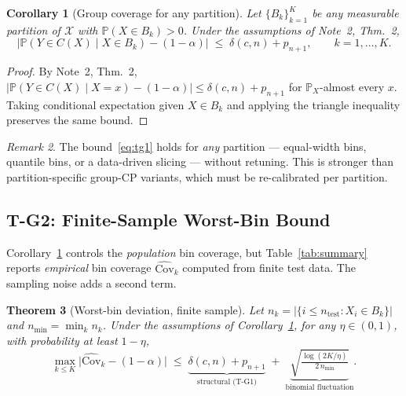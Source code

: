 \documentclass[11pt]{article}
\newtheorem{theorem}{Theorem}
\newtheorem{corollary}[theorem]{Corollary}
\theoremstyle{remark}
\newtheorem{remark}[theorem]{Remark}
\begin{document}
\begin{corollary}[Group coverage for any partition]
\label{cor:tg1}
Let $\{B_k\}_{k=1}^{K}$ be any measurable partition of $\mathcal X$
with $\mathbb P(X \in B_k) > 0$. Under the assumptions of Note~2,
Thm.~2,
\begin{equation}
\label{eq:tg1}
  \bigl|\mathbb P(Y \in C(X) \mid X \in B_k)-(1-\alpha)\bigr|
  \;\le\; \delta(c,n) + p_{n+1},
  \qquad k = 1,\ldots,K.
\end{equation}
\end{corollary}

\begin{proof}[Proof]
By Note~2, Thm.~2, $\bigl|\mathbb P(Y\in C(X)\mid X=x) - (1-\alpha)\bigr|
\le \delta(c,n) + p_{n+1}$ for $\mathbb P_X$-almost every $x$. Taking
conditional expectation given $X\in B_k$ and applying the triangle
inequality preserves the same bound.
\end{proof}

\begin{remark}
The bound~\eqref{eq:tg1} holds for \emph{any} partition --- equal-width
bins, quantile bins, or a data-driven slicing --- without retuning.
This is stronger than partition-specific group-CP variants, which must
be re-calibrated per partition.
\end{remark}

\subsection{T-G2: Finite-Sample Worst-Bin Bound}
\label{sec:tg2}

Corollary~\ref{cor:tg1} controls the \emph{population} bin coverage,
but Table~\ref{tab:summary} reports \emph{empirical} bin coverage
$\widehat{\mathrm{Cov}}_k$ computed from finite test data. The sampling
noise adds a second term.

\begin{theorem}[Worst-bin deviation, finite sample]
\label{thm:tg2}
Let $n_k = |\{i \le n_{\mathrm{test}} : X_i \in B_k\}|$ and
$n_{\min} = \min_k n_k$. Under the assumptions of
Corollary~\ref{cor:tg1}, for any $\eta \in (0,1)$, with probability at
least $1-\eta$,
\begin{equation}
\label{eq:tg2}
  \max_{k \le K}\bigl|\widehat{\mathrm{Cov}}_k - (1-\alpha)\bigr|
  \;\le\;
  \underbrace{\delta(c,n) + p_{n+1}}_{\text{structural (T-G1)}}
  \;+\;
  \underbrace{\sqrt{\tfrac{\log(2K/\eta)}{2\,n_{\min}}}}_{\text{binomial fluctuation}}.
\end{equation}
\end{theorem}
\end{document}
